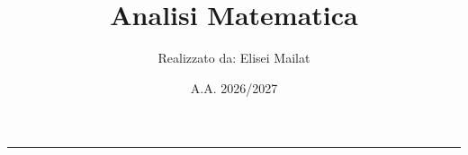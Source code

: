 \documentclass[a4paper,10pt]{article}
\title{\textbf{Analisi Matematica}}
\author{Realizzato da: Elisei Mailat}
\date{A.A. 2026/2027}
\theoremstyle{remark}
\theoremstyle{definition}
\theoremstyle{plain}
\theoremstyle{definition}
\theoremstyle{definition}
\theoremstyle{definition}
\theoremstyle{plain}
\theoremstyle{plain}
\begin{document}


\tableofcontents
\newpage
\maketitle
\begin{center}
    \vspace{-20pt}
    \rule{11cm}{.1pt} 
\end{center}




















\end{document}
